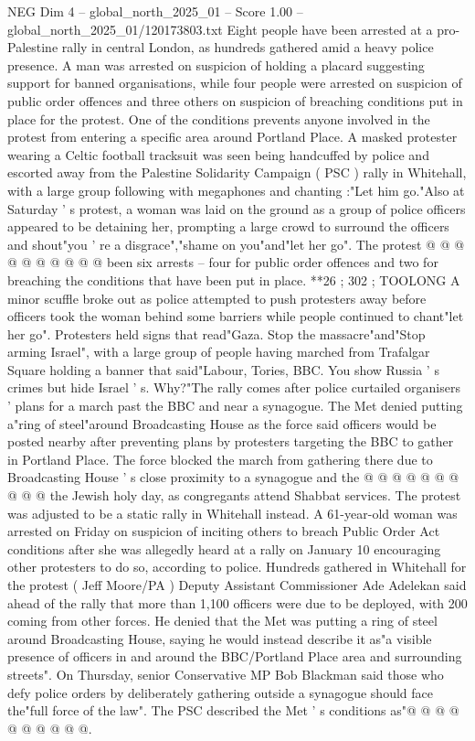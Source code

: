\begin{textsample}{NEG Dim 4 – global\_north\_2025\_01 – Score 1.00 – global\_north\_2025\_01/120173803.txt}  \label{ex:f4_neg_418}
Eight people have been arrested at a pro-Palestine rally in central London, as hundreds gathered amid a heavy police presence.
A man was arrested on suspicion of holding a placard suggesting support for banned organisations, while four people were arrested on suspicion of public order offences and three others on suspicion of breaching conditions put in place for the protest.
One of the conditions prevents anyone involved in the protest from entering a specific area around Portland Place.
A masked protester wearing a Celtic football tracksuit was seen being handcuffed by police and escorted away from the Palestine Solidarity Campaign ( PSC ) rally in Whitehall, with a large group following with megaphones and chanting :"Let him go."Also at Saturday ' s protest, a woman was laid on the ground as a group of police officers appeared to be detaining her, prompting a large crowd to surround the officers and shout"you ' re a disgrace","shame on you"and"let her go".
The protest @ @ @ @ @ @ @ @ @ @ been six arrests -- four for public order offences and two for breaching the conditions that have been put in place. **26 ; 302 ; TOOLONG A minor scuffle broke out as police attempted to push protesters away before officers took the woman behind some barriers while people continued to chant"let her go".
Protesters held signs that read"Gaza.
Stop the massacre"and"Stop arming Israel", with a large group of people having marched from Trafalgar Square holding a banner that said"Labour, Tories, BBC.
You show Russia ' s crimes but hide Israel ' s.
Why?"The rally comes after police curtailed organisers ' plans for a march past the BBC and near a synagogue.
The Met denied putting a"ring of steel"around Broadcasting House as the force said officers would be posted nearby after preventing plans by protesters targeting the BBC to gather in Portland Place.
The force blocked the march from gathering there due to Broadcasting House ' s close proximity to a synagogue and the @ @ @ @ @ @ @ @ @ @ the Jewish holy day, as congregants attend Shabbat services.
The protest was adjusted to be a static rally in Whitehall instead.
A 61-year-old woman was arrested on Friday on suspicion of inciting others to breach Public Order Act conditions after she was allegedly heard at a rally on January 10 encouraging other protesters to do so, according to police.
Hundreds gathered in Whitehall for the protest ( Jeff Moore/PA ) Deputy Assistant Commissioner Ade Adelekan said ahead of the rally that more than 1,100 officers were due to be deployed, with 200 coming from other forces.
He denied that the Met was putting a ring of steel around Broadcasting House, saying he would instead describe it as"a visible presence of officers in and around the BBC/Portland Place area and surrounding streets".
On Thursday, senior Conservative MP Bob Blackman said those who defy police orders by deliberately gathering outside a synagogue should face the"full force of the law".
The PSC described the Met ' s conditions as"@ @ @ @ @ @ @ @ @ @.

\end{textsample}
